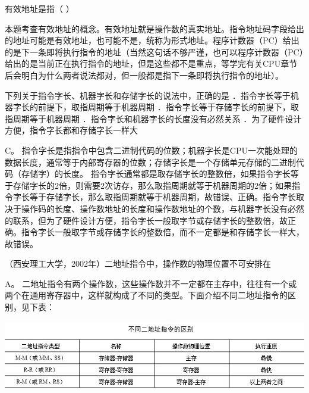 \question 有效地址是指（ ）
\par{}
\begin{solution}本题考查有效地址的概念。有效地址就是操作数的真实地址。指令地址码字段给出的地址可能是有效地址，也可能不是，统称为形式地址。程序计数器（PC）给出的是下一条即将执行指令的地址（当然这句话不够严谨，也可以程序计数器（PC）给出的是当前正在执行指令的地址，但是这些都不是重点，等学完有关CPU章节后会明白为什么两者说法都对，但一般都是指下一条即将执行指令的地址）。
\end{solution}
\question 下列关于指令字长、机器字长和存储字长的说法中，正确的是
．指令字长等于机器字长的前提下，取指周期等于机器周期
．指令字长等于存储字长的前提下，取指周期等于机器周期
．指令字长和机器字长的长度没有必然关系
．为了硬件设计方便，指令字长都和存储字长一样大
\par{}
\begin{solution}C。
指令字长是指指令中包含二进制代码的位数；机器字长是CPU一次能处理的数据长度，通常等于内部寄存器的位数；存储字长是一个存储单元存储的二进制代码（存储字）的长度。
指令字长通常都是取存储字长的整数倍，如果指令字长等于存储字长的2倍，则需要2次访存，那么取指周期就等于机器周期的2倍；如果指令字长等于存储字长，那么取指周期就等于机器周期，故错误、正确。指令字长取决于操作码的长度、操作数地址的长度和操作数地址的个数，与机器字长没有必然的联系，但为了硬件设计方便，指令字长一般取字节或存储字长的整数倍，故正确。指令字长一般取字节或存储字长的整数倍，而不一定都是和存储字长一样大，故错误。
\end{solution}
\question （西安理工大学，2002年）二地址指令中，操作数的物理位置不可安排在
\par{}
\begin{solution}A。
二地址指令有两个操作数，这些操作数并不一定都在主存中，往往有一个或两个在通用寄存器中，这样就构成了不同的类型。下面介绍不同二地址指令的区别，见下表：
\includegraphics[width=6.85417in,height=1.48958in]{computerassets/4816e952d855fb6bd05b9a469095a3a0.jpeg}
\end{solution}
